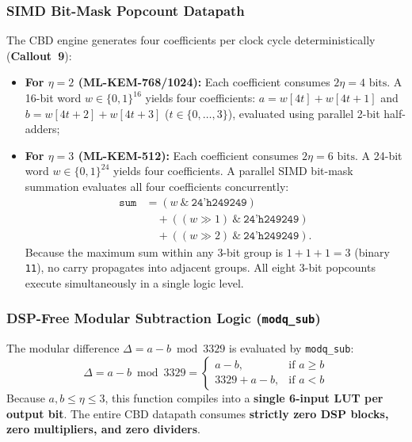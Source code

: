 \subsubsection{SIMD Bit-Mask Popcount Datapath}
The CBD engine generates four coefficients per clock cycle deterministically (\textbf{Callout~9}):
\begin{itemize}
    \item \textbf{For $\eta = 2$ (\mbox{ML-KEM-768/1024}):} Each coefficient consumes $2\eta = 4\text{ bits}$. A 16-bit word $w \in \{0, 1\}^{16}$ yields four coefficients: $a = w[4t] + w[4t+1]$ and $b = w[4t+2] + w[4t+3]$ ($t \in \{0, \dots, 3\}$), evaluated using parallel 2-bit half-adders;
    \item \textbf{For $\eta = 3$ (\mbox{ML-KEM-512}):} Each coefficient consumes $2\eta = 6\text{ bits}$. A 24-bit word $w \in \{0, 1\}^{24}$ yields four coefficients. A parallel SIMD bit-mask summation evaluates all four coefficients concurrently:
    \begin{equation}
    \begin{aligned}
    \texttt{sum} &= (w \ \& \ \texttt{24'h249249}) \\
                 &\quad + ((w \gg 1) \ \& \ \texttt{24'h249249}) \\
                 &\quad + ((w \gg 2) \ \& \ \texttt{24'h249249}).
    \end{aligned}
    \label{eq:simd_popcount}
    \end{equation}
    Because the maximum sum within any 3-bit group is $1 + 1 + 1 = 3$ (binary \texttt{11}), no carry propagates into adjacent groups. All eight 3-bit popcounts execute simultaneously in a single logic level.
\end{itemize}

\subsubsection{DSP-Free Modular Subtraction Logic (\texttt{modq\_sub})}
The modular difference $\Delta = a - b \bmod 3329$ is evaluated by \texttt{modq\_sub}:
\begin{equation}
\Delta = a - b \bmod 3329 = \begin{cases} a - b, & \text{if } a \ge b \\ 3329 + a - b, & \text{if } a < b \end{cases}
\label{eq:modq_sub}
\end{equation}
Because $a, b \le \eta \le 3$, this function compiles into a \textbf{single 6-input LUT per output bit}. The entire CBD datapath consumes \textbf{strictly zero DSP blocks, zero multipliers, and zero dividers}.


